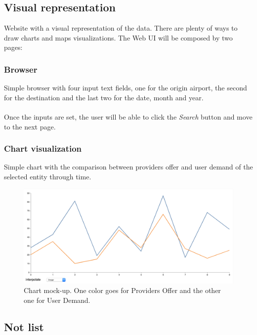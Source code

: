 \subsection{Visual representation} \label{visual_representation}

Website with a visual representation of the data. There are plenty of ways to draw charts and maps visualizations. The Web UI will be composed by two pages:

\subsubsection*{Browser} \label{browser}

Simple browser with four input text fields, one for the origin airport, the second for the destination and the last two for the date, month and year.
\\\\
Once the inputs are set, the user will be able to click the \textit{Search} button and move to the next page.

\subsubsection*{Chart visualization} \label{chart_visualization}

Simple chart with the comparison between providers offer and user demand of the selected entity through time.

\begin{figure}[H]
\centering
\includegraphics[scale=0.4]{resources/lineal-chart-example01.png}
\caption{Chart mock-up. One color goes for Providers Offer and the other one for User Demand.}
\end{figure}

\subsection{Not list} \label{not_list}

